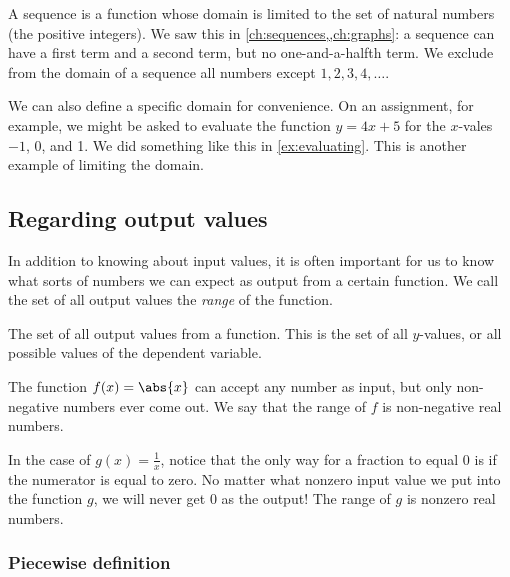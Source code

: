 A sequence is a function whose domain is limited to the set of natural numbers (the positive integers). We saw this in \cref{ch:sequences,,ch:graphs}: a sequence can have a first term and a second term, but no one-and-a-halfth term. We exclude from the domain of a sequence all numbers except $1, 2, 3, 4, \dotsc$.

We can also define a specific domain for convenience. On an assignment, for example, we might be asked to evaluate the function $y=4x+5$ for the $x$-vales $-1$, 0, and 1. We did something like this in \cref{ex:evaluating}. This is another example of limiting the domain.


\subsection{Regarding output values}

In addition to knowing about input values, it is often important for us to know what sorts of numbers we can expect as output from a certain function. We call the set of all output values the \textit{range} of the function.

\begin{boxeddef}[Range]
The set of all output values from a function. This is the set of all $y$-values, or all possible values of the dependent variable.
\end{boxeddef}

The function $f(x) = \abs{x}$ can accept any number as input, but only non-negative numbers ever come out. We say that the range of $f$ is non-negative real numbers.

In the case of $g(x) = \frac{1}{x}$, notice that the only way for a fraction to equal 0 is if the numerator is equal to zero. No matter what nonzero input value we put into the function $g$, we will never get 0 as the output! The range of $g$ is nonzero real numbers.


\subsubsection{Piecewise definition}

